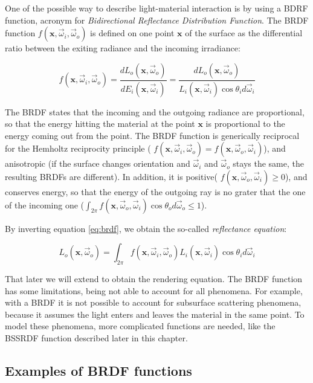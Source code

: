 One of the possible way to describe light-material interaction is by using a BDRF function, acronym for \emph{Bidirectional Reflectance Distribution Function}. The BRDF function $f(\mathbf{x}, \vec{\omega}_i, \vec{\omega}_o)$ is defined on one point $\mathbf{x}$ of the surface as the differential ratio between the exiting radiance and the incoming irradiance:

\begin{equation}
f(\mathbf{x}, \vec{\omega}_i, \vec{\omega}_o) = \frac{d L_o(\mathbf{x}, \vec{\omega}_o)}{d E_i(\mathbf{x}, \vec{\omega}_i)} = \frac{d L_o(\mathbf{x}, \vec{\omega}_o)}{L_i(\mathbf{x}, \vec{\omega}_i) \cos\theta_i d \vec{\omega}_i}
\label{eq:brdf}
\end{equation}

The BRDF states that the incoming and the outgoing radiance are proportional, so that the energy hitting the material at the point $\mathbf{x}$ is proportional to the energy coming out from the point. The BRDF function is generically reciprocal for the Hemholtz reciprocity principle ( $f(\mathbf{x}, \vec{\omega}_i, \vec{\omega}_o) = f(\mathbf{x}, \vec{\omega}_o, \vec{\omega}_i)$), and anisotropic (if the surface changes orientation and $\vec{\omega}_i$ and $\vec{\omega}_o$ stays the same, the resulting BRDFs are different). In addition, it is positive( $f(\mathbf{x}, \vec{\omega}_o, \vec{\omega}_i) \ge 0$), and conserves energy, so that the energy of the outgoing ray is no grater that the one of the incoming one ($\int_{2\pi}  f(\mathbf{x}, \vec{\omega}_o, \vec{\omega}_i) \cos\theta_o d\vec{\omega}_o \le 1$).

By inverting equation \ref{eq:brdf}, we obtain the so-called \emph{reflectance equation}:

$$
L_o(\mathbf{x}, \vec{\omega}_o) = \int_{2\pi} f(\mathbf{x}, \vec{\omega}_i, \vec{\omega}_o) L_i(\mathbf{x}, \vec{\omega}_i) \cos\theta_i d\vec{\omega}_i
$$

That later we will extend to obtain the rendering equation. The BRDF function has some limitations, being not able to account for all phenomena. For example, with a BRDF it is not possible to account for subsurface scattering phenomena, because it assumes the light enters and leaves the material in the same point. To model these phenomena, more complicated functions are needed, like the BSSRDF function described later in this chapter. 

\subsection{Examples of BRDF functions}

